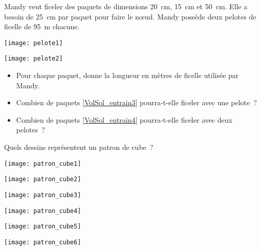 \begin{exercice}[Paquets]
Mandy veut ficeler des paquets de dimensions 20 cm, 15 cm et 50 cm. Elle a besoin de 25 cm par paquet pour faire le nœud. Mandy possède deux pelotes de ficelle de 95 m chacune.
\begin{colenumerate}{2}
 \item
 
 \texttt{[image: pelote1]} \label{VolSol_entrain3}
 \item
 
 \texttt{[image: pelote2]} \label{VolSol_entrain4}
 \end{colenumerate}
\begin{itemize}
 \item Pour chaque paquet, donne la longueur en mètres de ficelle utilisée par Mandy.
 \item Combien de paquets \ref{VolSol_entrain3} pourra‑t‑elle ficeler avec une pelote ?
 \item Combien de paquets \ref{VolSol_entrain4} pourra‑t‑elle ficeler avec deux pelotes ?
 \end{itemize}
\end{exercice}



\begin{exercice}
Quels dessins représentent un patron de cube ? 
\begin{colenumerate}{3}
 \item
 
 \texttt{[image: patron\_cube1]}
 \item
 
 \texttt{[image: patron\_cube2]}
 \item
 
 \texttt{[image: patron\_cube3]}
 \item
 
 \texttt{[image: patron\_cube4]}
 \item
 
 \texttt{[image: patron\_cube5]}
 \item
 
 \texttt{[image: patron\_cube6]}
 \end{colenumerate}
\end{exercice}


